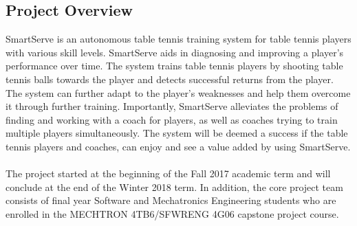 \documentclass[11pt]{article}
\begin{document}
\subsection{Project Overview}
SmartServe is an autonomous table tennis training system for table tennis players with various skill levels. SmartServe aids in diagnosing and improving a player's performance over time. The system trains table tennis players by shooting table tennis balls towards the player and detects successful returns from the player. The system can further adapt to the player's weaknesses and help them overcome it through further training. Importantly, SmartServe alleviates the problems of finding and working with a coach for players, as well as coaches trying to train multiple players simultaneously. The system will be deemed a success if the table tennis players and coaches, can enjoy and see a value added by using SmartServe.\\\\
The project started at the beginning of the Fall 2017 academic term and will conclude at the end of the Winter 2018 term. In addition, the core project team consists of final year Software and Mechatronics Engineering students who are enrolled in the MECHTRON 4TB6/SFWRENG 4G06 capstone project course.
\end{document}
